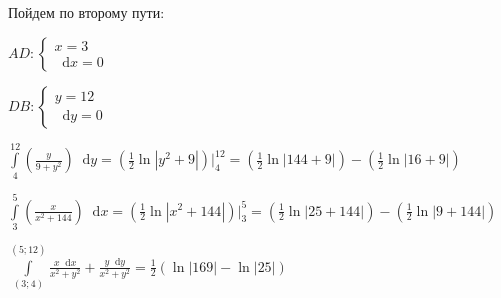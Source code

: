 \documentclass{article}
\newcommand*\diff{\mathop{}\!\mathrm{d}}
\begin{document}
Пойдем по второму пути:

$AD: \begin{cases}
    x = 3 \\
    \diff x = 0
\end{cases}$

$DB: \begin{cases}
    y = 12 \\
    \diff y = 0
\end{cases}$

$\int\limits_{4}^{12} (\frac{y}{9 + y^2}) \diff y = (\frac{1}{2} \ln |y^2 + 9|) \bigg|_{4}^{12} = (\frac{1}{2} \ln |144 + 9|) - (\frac{1}{2} \ln |16 + 9|)$

$\int\limits_{3}^{5} (\frac{x}{x^2 + 144}) \diff x = (\frac{1}{2} \ln |x^2 + 144|) \bigg|_{3}^{5} = (\frac{1}{2} \ln |25 + 144|) - (\frac{1}{2} \ln |9 + 144|)$

$\int\limits_{(3;4)}^{(5;12)} \frac{x \diff x}{x^2 + y^2} + \frac{y \diff y}{x^2 + y^2} = \frac{1}{2} (\ln|169| - \ln |25|)$
\end{document}
